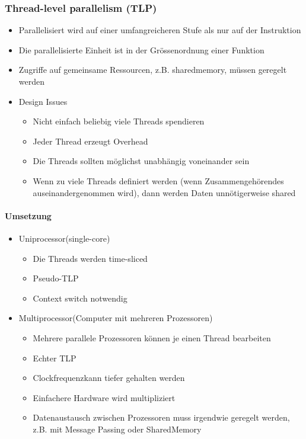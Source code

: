 \begin{multicols}{2}
\subsubsection{Thread-level parallelism (TLP)}
\begin{itemize}
	\item Parallelisiert wird auf einer umfangreicheren Stufe als nur auf der Instruktion 
	\item Die parallelisierte Einheit ist in der Grössenordnung einer Funktion 
	\item Zugriffe auf gemeinsame Ressourcen, z.B. sharedmemory, müssen geregelt werden 
	\item Design Issues 
	\begin{itemize}
		\item Nicht einfach beliebig viele Threads spendieren 
		\item Jeder Thread erzeugt Overhead 
		\item Die Threads sollten möglichst unabhängig voneinander sein
		\item Wenn zu viele Threads definiert werden (wenn Zusammengehörendes auseinandergenommen wird), dann werden Daten unnötigerweise shared
	\end{itemize}		
\end{itemize}
\columnbreak
\paragraph{Umsetzung}
\begin{itemize}
	\item Uniprocessor(single-core) 
	\begin{itemize}
		\item Die Threads werden time-sliced 
		\item Pseudo-TLP
		\item Context switch notwendig
	\end{itemize}
	\item  Multiprocessor(Computer mit mehreren Prozessoren) 
	\begin{itemize}
		\item Mehrere parallele Prozessoren können je einen Thread bearbeiten 
		\item Echter TLP 
		\item Clockfrequenzkann tiefer gehalten werden 
		\item Einfachere Hardware wird multipliziert 
		\item Datenaustausch zwischen Prozessoren muss irgendwie geregelt werden, z.B. mit Message Passing oder SharedMemory
	\end{itemize}
\end{itemize}
\end{multicols}
\newpage

